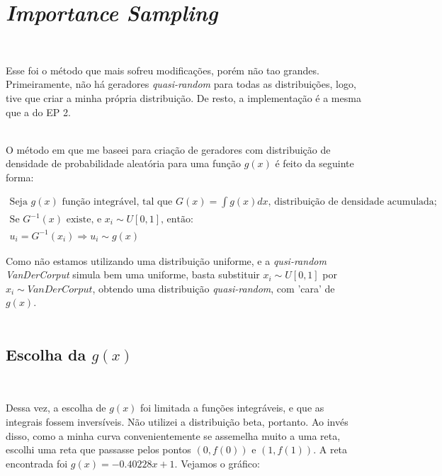 \documentclass[pt12]{article}
\begin{document}
\section{\textit{Importance Sampling}}
\ 

Esse foi o método que mais sofreu modificações, porém não tao grandes. Primeiramente, não há geradores \textit{quasi-random} para todas as distribuições, logo, tive que criar a minha própria distribuição. De resto, a implementação é a mesma que a do EP 2.\\
\ 

O método em que me baseei para criação de geradores com distribuição de densidade de probabilidade aleatória para uma função $g(x)$ é feito da seguinte forma:

\begin{align}
\text{Seja $g(x)$ função integrável, tal que $G(x) = \int g(x)dx$, distribuição de densidade acumulada;}\\
\text{Se $G^{-1}(x)$ existe, e $x_{i}\sim U[0,1]$, então:}\\
u_{i} = G^{-1}(x_i) \Rightarrow u_{i}\sim g(x)
\end{align}
\newpage

Como não estamos utilizando uma distribuição uniforme, e a \textit{qusi-random VanDerCorput} simula bem uma uniforme, basta substituir $x_i \sim U[0,1]$ por $x_i \sim VanDerCorput$, obtendo uma distribuição \textit{quasi-random}, com 'cara' de $g(x)$.\\
\ 

\subsection{Escolha da $g(x)$}
\ 

Dessa vez, a escolha de $g(x)$ foi limitada a funções integráveis, e que as integrais fossem inversíveis. Não utilizei a distribuição beta, portanto. Ao invés disso, como a minha curva convenientemente se assemelha muito a uma reta, escolhi uma reta que passasse pelos pontos $(0,f(0))$ e $(1,f(1))$. A reta encontrada foi $g(x) = -0.40228x + 1$. Vejamos o gráfico:\\
\ 
\end{document}
